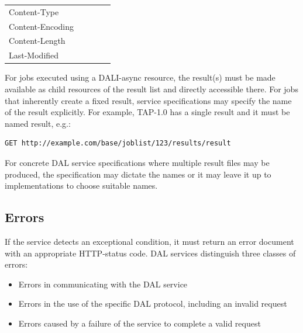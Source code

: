 \documentclass[11pt,letter]{ivoa}
\begin{document}
\begin{tabular}{l l l l l}
\label{tab:headers}
Content-Type \\
Content-Encoding \\
Content-Length \\
Last-Modified \\
\end{tabular}

For jobs executed using a DALI-async resource, the result(s) must be made 
available as child resources of the result list and directly accessible there. 
For jobs that inherently create a fixed result, service specifications may 
specify the name of the result explicitly. For example, TAP-1.0 has a single 
result and it must be named result, e.g.:

\begin{verbatim}
GET http://example.com/base/joblist/123/results/result
\end{verbatim}

For concrete DAL service specifications where multiple result files may be 
produced, the specification may dictate the names or it may leave it up to 
implementations to choose suitable names.

\subsection{Errors}
\label{sec:response-error}
If the service detects an exceptional condition, it must return an error 
document with an appropriate HTTP-status code. DAL services distinguish three 
classes of errors:

\begin{itemize}
\item Errors in communicating with the DAL service 

\item Errors in the use of the specific DAL protocol, including an invalid 
request 

\item Errors caused by a failure of the service to complete a valid request 
\end{itemize}
\end{document}
